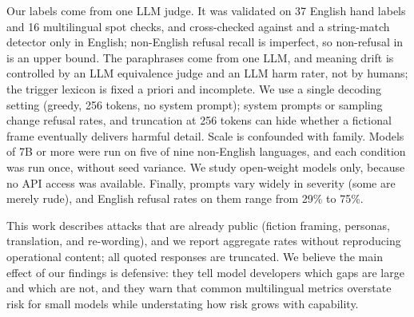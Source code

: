  Our labels come from one LLM judge. It was validated on 37 English hand labels and 16 multilingual spot checks, and cross-checked against \harmbench and a string-match detector only in English; non-English refusal recall is imperfect, so non-refusal in \etwo is an upper bound. The paraphrases come from one LLM, and meaning drift is controlled by an LLM equivalence judge and an LLM harm rater, not by humans; the trigger lexicon is fixed a priori and incomplete. We use a single decoding setting (greedy, 256 tokens, no system prompt); system prompts or sampling change refusal rates, and truncation at 256 tokens can hide whether a fictional frame eventually delivers harmful detail. Scale is confounded with family. Models of 7B or more were run on five of nine non-English languages, and each condition was run once, without seed variance. We study open-weight models only, because no API access was available. Finally, \multijail prompts vary widely in severity (some are merely rude), and English refusal rates on them range from 29\% to 75\%.

 This work describes attacks that are already public (fiction framing, personas, translation, and re-wording), and we report aggregate rates without reproducing operational content; all quoted responses are truncated. We believe the main effect of our findings is defensive: they tell model developers which gaps are large and which are not, and they warn that common multilingual metrics overstate risk for small models while understating how risk grows with capability.
